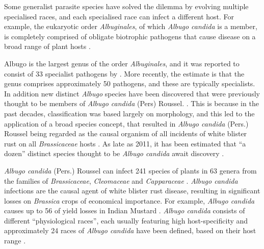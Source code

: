 Some generalist parasite species have solved the dilemma by evolving multiple specialised races, and each specialised race can infect a different host. For example, the eukaryotic order \textit{Albuginales}, of which \textit{Albugo candida} is a member, is completely comprised of obligate biotrophic pathogens that cause disease on a broad range of plant hosts \parencite{Biga1955ReviewConidia.,Choi1955,Walker2007AHost.}.

Albugo is the largest genus of the order \textit{Albuginales}, and it was reported to consist of 33 specialist pathogens by \cite{Biga1955ReviewConidia.}⁠. More recently, the estimate is that the genus comprises approximately 50 pathogens, and these are typically specialists. In addition new distinct \textit{Albugo} species have been discovered that were previously thought to be members of \textit{Albugo candida} (Pers) Roussel. \parencite{Choi2011,Choi2009,Ploch2010,Thines2009}. This is because in the past decades, classification was based largely on morphology, and this led to the application of a broad species concept, that resulted in \textit{Albugo candida} (Pers.) Roussel being regarded as the causal organism of all incidents of white blister rust on all \textit{Brassicaceae} hosts \parencite{Choi2011}. As late as 2011, it has been estimated that “a dozen” distinct species thought to be \textit{Albugo candida} await discovery \parencite{lamour2009oomycete}.

\textit{Albugo candida} (Pers.) Roussel can infect 241 species of plants in 63 genera from the families of \textit{Brassicaceae}, \textit{Cleomaceae} and \textit{Capparaceae} \parencite{Choi2009}⁠. \textit{Albugo candida} infections are the causal agent of white blister rust disease, resulting in significant losses on \textit{Brassica} crops of economical importance. For example, \textit{Albugo candida} causes  up to 56 of yield losses in Indian Mustard \parencite{Meena2002YieldSeverity}. \textit{Albugo candida} consists of different “physiological races”, each usually featuring high host-specificity and approximately 24 races of \textit{Albugo candida} have been defined, based on their host range \parencite{saharan2014white,Saharan1992WhiteSpecies}.

